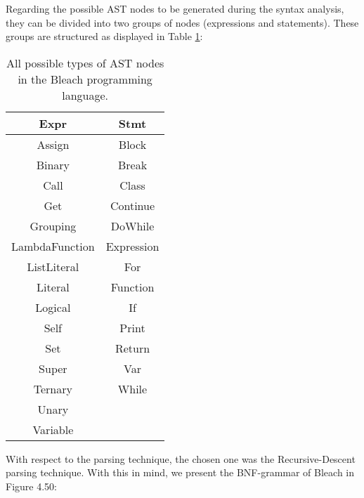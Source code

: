 Regarding the possible AST nodes to be generated during the syntax analysis, they can be divided into two groups of nodes (expressions and statements). These groups are structured as displayed in Table \ref{tab:ASTNodes}:

\begin{table}[h!]
\centering
    \begin{tabular}{|c|c|}
    \hline
    \textbf{Expr} & \textbf{Stmt} \\ \hline
    Assign & Block \\ \hline
    Binary & Break \\ \hline
    Call & Class \\ \hline
    Get & Continue \\ \hline
    Grouping & DoWhile \\ \hline
    LambdaFunction & Expression \\ \hline
    ListLiteral & For \\ \hline
    Literal & Function \\ \hline
    Logical & If \\ \hline
    Self & Print \\ \hline
    Set & Return \\ \hline
    Super & Var \\ \hline  
    Ternary & While \\ \hline
    Unary &  \\ \hline
    Variable &  \\ \hline
    \end{tabular}
    \caption{All possible types of AST nodes in the Bleach programming language. \newline}
    \label{tab:ASTNodes}  %
\end{table}


With respect to the parsing technique, the chosen one was the Recursive-Descent parsing technique. With this in mind, we present the BNF-grammar of Bleach in Figure 4.50: \newline

